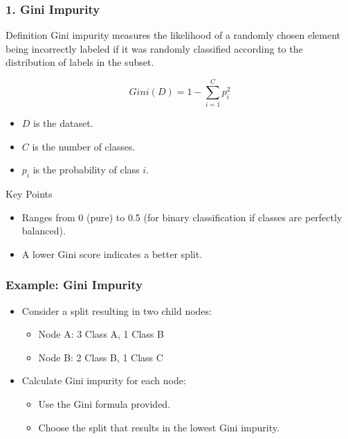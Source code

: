 \documentclass[aspectratio=169]{beamer}
\begin{document}
\begin{frame}[fragile]
    \frametitle{1. Gini Impurity}

    \begin{block}{Definition}
        Gini impurity measures the likelihood of a randomly chosen element being incorrectly labeled if it was randomly classified according to the distribution of labels in the subset.
    \end{block}
    
    \begin{equation}
        Gini(D) = 1 - \sum_{i=1}^{C} p_i^2
    \end{equation}
    
    \begin{itemize}
        \item \( D \) is the dataset.
        \item \( C \) is the number of classes.
        \item \( p_i \) is the probability of class \( i \).
    \end{itemize}
    
    \begin{block}{Key Points}
        \begin{itemize}
            \item Ranges from 0 (pure) to 0.5 (for binary classification if classes are perfectly balanced).
            \item A lower Gini score indicates a better split.
        \end{itemize}
    \end{block}
    
\end{frame}

\begin{frame}[fragile]
    \frametitle{Example: Gini Impurity}

    \begin{itemize}
        \item Consider a split resulting in two child nodes:
        \begin{itemize}
            \item Node A: 3 Class A, 1 Class B
            \item Node B: 2 Class B, 1 Class C
        \end{itemize}
        \item Calculate Gini impurity for each node:
        \begin{itemize}
            \item Use the Gini formula provided.
            \item Choose the split that results in the lowest Gini impurity.
        \end{itemize}
    \end{itemize}

\end{frame}
\end{document}
